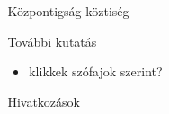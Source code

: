 \documentclass{beamer}
\newlength{\sepwid}
\newlength{\onecolwid}
\begin{document}
\begin{frame}[t]
\begin{columns}[t]
    \begin{column}{\sepwid}\end{column}			%

      \begin{column}{\onecolwid} %
        \begin{block}{Központigság}
          köztiség
        \end{block}


        \begin{block}{További kutatás}
          \begin{itemize}
            \item klikkek szófajok szerint?
          \end{itemize}
        \end{block}
        \begin{block}{Hivatkozások}
          
                
        \end{block}
      \end{column}

  \end{columns}
\end{frame}
\end{document}
